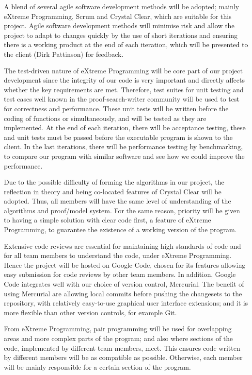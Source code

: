 A blend of several agile software development methods will be adopted; mainly eXtreme Programming, Scrum and Crystal Clear, which are suitable for this project. Agile software development methods will minimise risk and allow the project to adapt to changes quickly by the use of short iterations and ensuring there is a working product at the end of each iteration, which will be presented to the client (Dirk Pattinson) for feedback.

The test-driven nature of eXtreme Programming will be core part of our project development since the integrity of our code is very important and directly affects whether the key requirements are met. Therefore, test suites for unit testing and test cases well known in the proof-search-writer community will be used to test for correctness and performance. These unit tests will be written before the coding of functions or simultaneously, and will be tested as they are implemented. At the end of each iteration, there will be acceptance testing, these and unit tests must be passed before the executable program is shown to the client. In the last iterations, there will be performance testing by benchmarking, to compare our program with similar software and see how we could improve the performance.

Due to the possible difficulty of forming the algorithms in our project, the reflection in theory and being co-located features of Crystal Clear will be adopted. Thus, all members will have the same level of understanding of the algorithms and proof/model system. For the same reason, priority will be given to having a simple solution with clear code first, a feature of eXtreme Programming, to guarantee the existence of a working version of the program.

Extensive code reviews are essential for maintaining high standards of code and for all team members to understand the code, under eXtreme Programming. Hence the project will be hosted on Google Code, chosen for its features allowing easy submission for code reviews by other team members. In addition, Google Code integrates well with our choice of version control, Mercurial. The benefit of using Mercurial are allowing local commits before pushing the changesets to the repository, with relatively easy-to-use graphical user interface extensions; and it is more flexible than other version controls, for example Git.

From eXtreme Programming, pair programming will be used for overlapping areas and more complex parts of the program; and also where sections of the code, implemented by different team members, meet. This ensures code written by different members will be as compatible as possible. Otherwise, each member will be mainly responsible for a certain section of the program.

